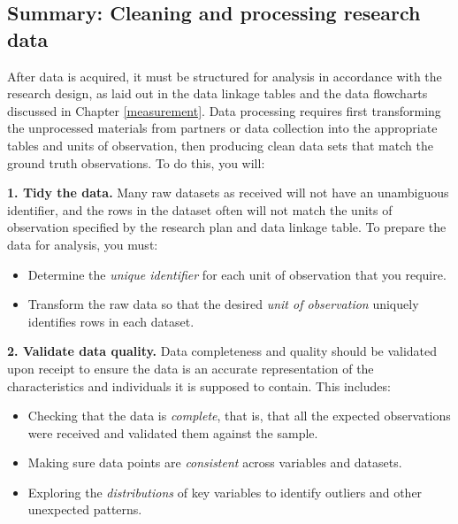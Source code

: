 \documentclass[
]{book}
\providecommand{\tightlist}{%
  \setlength{\itemsep}{0pt}\setlength{\parskip}{0pt}}
\begin{document}
\begin{summary}
\hypertarget{summary-cleaning-and-processing-research-data}{%
\subsection*{Summary: Cleaning and processing research data}\label{summary-cleaning-and-processing-research-data}}

After data is acquired, it must be structured for analysis in accordance with the research design, as laid out in the data linkage tables and the data flowcharts discussed in Chapter \ref{measurement}. Data processing requires first transforming the unprocessed materials from partners or data collection into the appropriate tables and units of observation, then producing clean data sets that match the ground truth observations. To do this, you will:

\textbf{1. Tidy the data.} Many raw datasets as received will not have an unambiguous identifier, and the rows in the dataset often will not match the units of observation specified by the research plan and data linkage table. To prepare the data for analysis, you must:

\begin{itemize}
\tightlist
\item
  Determine the \emph{unique identifier} for each unit of observation that you require.
\item
  Transform the raw data so that the desired \emph{unit of observation} uniquely identifies rows in each dataset.
\end{itemize}

\textbf{2. Validate data quality.} Data completeness and quality should be validated upon receipt to ensure the data is an accurate representation of the characteristics and individuals it is supposed to contain. This includes:

\begin{itemize}
\tightlist
\item
  Checking that the data is \emph{complete}, that is, that all the expected observations were received and validated them against the sample.
\item
  Making sure data points are \emph{consistent} across variables and datasets.
\item
  Exploring the \emph{distributions} of key variables to identify outliers and other unexpected patterns.
\end{itemize}


\end{summary}
\end{document}

